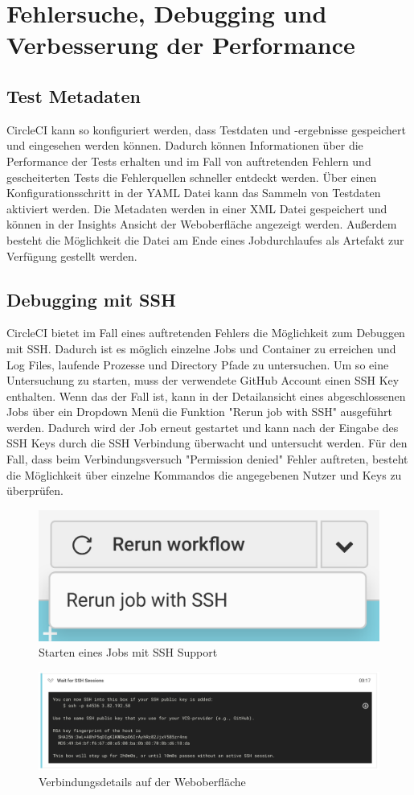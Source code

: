 \documentclass[11pt]{article}
\begin{document}
\section{Fehlersuche, Debugging und Verbesserung der Performance}
\subsection{Test Metadaten}
CircleCI kann so konfiguriert werden, dass Testdaten und -ergebnisse gespeichert und eingesehen werden können. Dadurch können Informationen über die Performance der Tests erhalten und im Fall von auftretenden Fehlern und  gescheiterten Tests die Fehlerquellen schneller entdeckt werden. Über einen Konfigurationsschritt in der  YAML Datei kann das Sammeln von Testdaten aktiviert werden. Die Metadaten werden in einer XML Datei gespeichert  und können in der Insights Ansicht der Weboberfläche angezeigt werden. Außerdem besteht die Möglichkeit die Datei am Ende eines Jobdurchlaufes als Artefakt zur Verfügung gestellt werden.

\subsection{Debugging mit SSH}
CircleCI bietet im Fall eines auftretenden Fehlers die Möglichkeit zum Debuggen mit SSH. Dadurch ist es  möglich einzelne Jobs und Container zu erreichen und Log Files, laufende Prozesse und Directory Pfade zu  untersuchen. Um so eine Untersuchung zu starten, muss der verwendete GitHub Account einen SSH Key enthalten. Wenn das der Fall ist, kann in der Detailansicht eines abgeschlossenen Jobs über ein Dropdown Menü die Funktion "Rerun job with SSH" ausgeführt werden. Dadurch wird der Job erneut gestartet und kann nach der Eingabe des  SSH Keys durch die SSH Verbindung überwacht und untersucht werden. Für den Fall, dass beim Verbindungsversuch "Permission denied" Fehler auftreten, besteht die Möglichkeit über einzelne Kommandos die angegebenen Nutzer und Keys zu überprüfen.

\begin{figure}[H]
	\centering
  	\includegraphics[width=0.25\linewidth]{../Images/SSH_Button}
  	\caption{Starten eines Jobs mit SSH Support}
  	\label{fig:ssh-button}
\end{figure}

\begin{figure}[H]
	\centering
  	\includegraphics[width=1\linewidth]{../Images/SSH_Output}
  	\caption{Verbindungsdetails auf der Weboberfläche}
  	\label{fig:ssh-output}
\end{figure}
\end{document}
